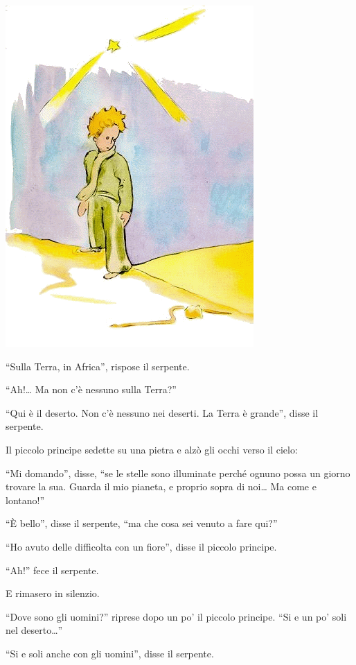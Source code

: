 \documentclass[11pt]{scrbook}
\begin{document}
\begin{center}
\includegraphics{./img/17a.png}
\end{center}

``Sulla Terra, in Africa'', rispose il serpente.

``Ah!\ldots{} Ma non c'è nessuno sulla Terra?''

``Qui è il deserto. Non c'è nessuno nei deserti. La Terra è grande'',
disse il serpente.

Il piccolo principe sedette su una pietra e alzò gli occhi verso il
cielo:

``Mi domando'', disse, ``se le stelle sono illuminate perché ognuno
possa un giorno trovare la sua. Guarda il mio pianeta, e proprio sopra
di noi\ldots{} Ma come e lontano!''

``È bello'', disse il serpente, ``ma che cosa sei venuto a fare qui?''

``Ho avuto delle difficolta con un fiore'', disse il piccolo principe.

``Ah!'' fece il serpente.

E rimasero in silenzio.

``Dove sono gli uomini?'' riprese dopo un po' il piccolo principe. ``Si
e un po' soli nel deserto\ldots{}''

``Si e soli anche con gli uomini'', disse il serpente.
\end{document}

